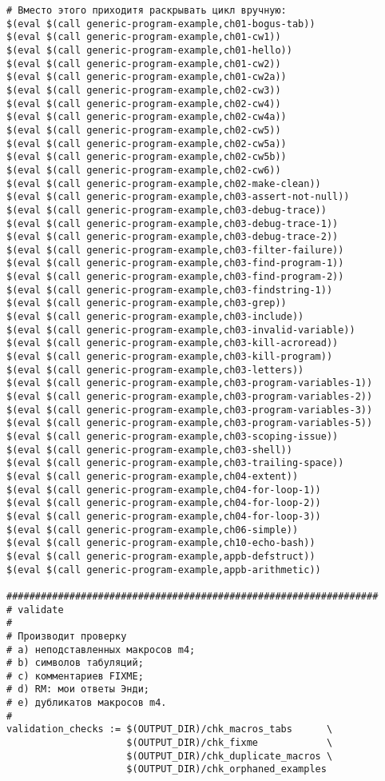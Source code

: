\begin{verbatim}
# Вместо этого приходитя раскрывать цикл вручную:
$(eval $(call generic-program-example,ch01-bogus-tab))
$(eval $(call generic-program-example,ch01-cw1))
$(eval $(call generic-program-example,ch01-hello))
$(eval $(call generic-program-example,ch01-cw2))
$(eval $(call generic-program-example,ch01-cw2a))
$(eval $(call generic-program-example,ch02-cw3))
$(eval $(call generic-program-example,ch02-cw4))
$(eval $(call generic-program-example,ch02-cw4a))
$(eval $(call generic-program-example,ch02-cw5))
$(eval $(call generic-program-example,ch02-cw5a))
$(eval $(call generic-program-example,ch02-cw5b))
$(eval $(call generic-program-example,ch02-cw6))
$(eval $(call generic-program-example,ch02-make-clean))
$(eval $(call generic-program-example,ch03-assert-not-null))
$(eval $(call generic-program-example,ch03-debug-trace))
$(eval $(call generic-program-example,ch03-debug-trace-1))
$(eval $(call generic-program-example,ch03-debug-trace-2))
$(eval $(call generic-program-example,ch03-filter-failure))
$(eval $(call generic-program-example,ch03-find-program-1))
$(eval $(call generic-program-example,ch03-find-program-2))
$(eval $(call generic-program-example,ch03-findstring-1))
$(eval $(call generic-program-example,ch03-grep))
$(eval $(call generic-program-example,ch03-include))
$(eval $(call generic-program-example,ch03-invalid-variable))
$(eval $(call generic-program-example,ch03-kill-acroread))
$(eval $(call generic-program-example,ch03-kill-program))
$(eval $(call generic-program-example,ch03-letters))
$(eval $(call generic-program-example,ch03-program-variables-1))
$(eval $(call generic-program-example,ch03-program-variables-2))
$(eval $(call generic-program-example,ch03-program-variables-3))
$(eval $(call generic-program-example,ch03-program-variables-5))
$(eval $(call generic-program-example,ch03-scoping-issue))
$(eval $(call generic-program-example,ch03-shell))
$(eval $(call generic-program-example,ch03-trailing-space))
$(eval $(call generic-program-example,ch04-extent))
$(eval $(call generic-program-example,ch04-for-loop-1))
$(eval $(call generic-program-example,ch04-for-loop-2))
$(eval $(call generic-program-example,ch04-for-loop-3))
$(eval $(call generic-program-example,ch06-simple))
$(eval $(call generic-program-example,ch10-echo-bash))
$(eval $(call generic-program-example,appb-defstruct))
$(eval $(call generic-program-example,appb-arithmetic))

#################################################################
# validate
#
# Производит проверку
# a) неподставленных макросов m4;
# b) символов табуляций;
# c) комментариев FIXME;
# d) RM: мои ответы Энди;
# e) дубликатов макросов m4.
#
validation_checks := $(OUTPUT_DIR)/chk_macros_tabs      \
                     $(OUTPUT_DIR)/chk_fixme            \
                     $(OUTPUT_DIR)/chk_duplicate_macros \
                     $(OUTPUT_DIR)/chk_orphaned_examples


\end{verbatim}
